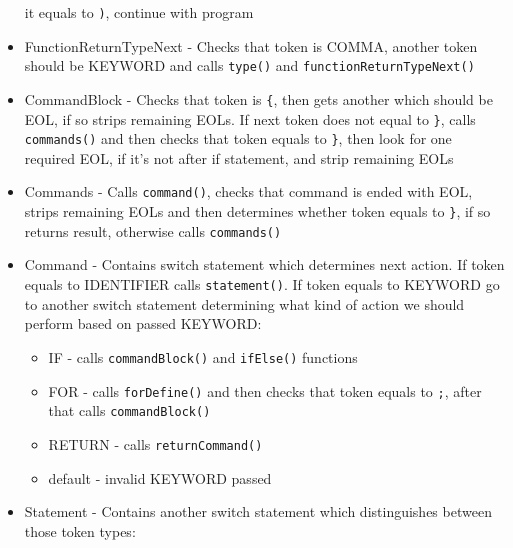 \documentclass[11pt, titlepage]{article}
\begin{document}
\begin{itemize}[itemsep=-5pt]
  it equals to \texttt{)}, continue with program
\item
  FunctionReturnTypeNext - Checks that token is COMMA, another token
  should be KEYWORD and calls \texttt{type()} and
  \texttt{functionReturnTypeNext()}
\item
  CommandBlock - Checks that token is \texttt{\{}, then gets another
  which should be EOL, if so strips remaining EOLs. If next token does
  not equal to \texttt{\}}, calls \texttt{commands()} and then checks that
  token equals to \texttt{\}}, then look for one required EOL, if it's not after 
  if statement, and strip remaining EOLs
\item
  Commands - Calls \texttt{command()}, checks that command is ended with
  EOL, strips remaining EOLs and then determines whether token equals to
  \texttt{\}}, if so returns result, otherwise calls \texttt{commands()}
\item
  Command - Contains switch statement which determines next action. If
  token equals to IDENTIFIER calls \texttt{statement()}. If token equals
  to KEYWORD go to another switch statement determining what kind of
  action we should perform based on passed KEYWORD:

  \begin{itemize}[itemsep=-5pt]
  \item
    IF - calls \texttt{commandBlock()} and \texttt{ifElse()} functions
  \item
    FOR - calls \texttt{forDefine()} and then checks that token equals to
    \texttt{;}, after that calls \texttt{commandBlock()}
  \item
    RETURN - calls \texttt{returnCommand()}
  \item
    default - invalid KEYWORD passed
  \end{itemize}
\item
  Statement - Contains another switch statement which distinguishes
  between those token types:


\end{itemize}
\end{document}
